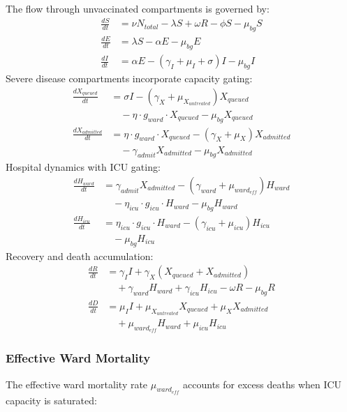 \documentclass[10pt,twocolumn]{article}
\begin{document}
The flow through unvaccinated compartments is governed by:
\begin{align*}
\frac{dS}{dt} &= \nu N_{total} - \lambda S + \omega R - \phi S - \mu_{bg} S \\[0.5em]
\frac{dE}{dt} &= \lambda S - \alpha E - \mu_{bg} E \\[0.5em]
\frac{dI}{dt} &= \alpha E - (\gamma_I + \mu_I + \sigma) I - \mu_{bg} I
\end{align*}
Severe disease compartments incorporate capacity gating:
\begin{align*}
\frac{dX_{queued}}{dt} &= \sigma I - (\gamma_X + \mu_{X_{untreated}}) X_{queued} \nonumber \\
&\quad - \eta \cdot g_{ward} \cdot X_{queued} - \mu_{bg} X_{queued} \\[0.5em]
\frac{dX_{admitted}}{dt} &= \eta \cdot g_{ward} \cdot X_{queued} - (\gamma_X + \mu_X) X_{admitted} \nonumber \\
&\quad - \gamma_{admit} X_{admitted} - \mu_{bg} X_{admitted}
\end{align*}
Hospital dynamics with ICU gating:
\begin{align*}
\frac{dH_{ward}}{dt} &= \gamma_{admit} X_{admitted} - (\gamma_{ward} + \mu_{ward_{eff}}) H_{ward} \nonumber \\
&\quad - \eta_{icu} \cdot g_{icu} \cdot H_{ward} - \mu_{bg} H_{ward} \\[0.5em]
\frac{dH_{icu}}{dt} &= \eta_{icu} \cdot g_{icu} \cdot H_{ward} - (\gamma_{icu} + \mu_{icu}) H_{icu} \nonumber \\
&\quad - \mu_{bg} H_{icu}
\end{align*}
Recovery and death accumulation:
\begin{align*}
\frac{dR}{dt} &= \gamma_I I + \gamma_X (X_{queued} + X_{admitted}) \nonumber \\
&\quad + \gamma_{ward} H_{ward} + \gamma_{icu} H_{icu} - \omega R - \mu_{bg} R \\[0.5em]
\frac{dD}{dt} &= \mu_I I + \mu_{X_{untreated}} X_{queued} + \mu_X X_{admitted} \nonumber \\
&\quad + \mu_{ward_{eff}} H_{ward} + \mu_{icu} H_{icu}
\end{align*}

\subsubsection{Effective Ward Mortality}

The effective ward mortality rate $\mu_{ward_{eff}}$ accounts for excess deaths when ICU capacity is saturated:
\end{document}
